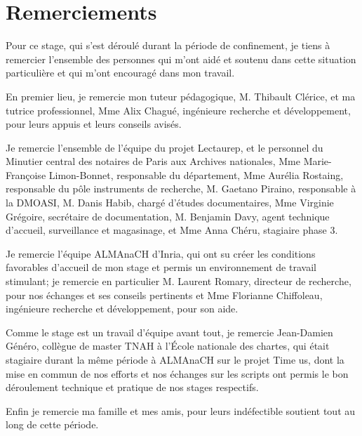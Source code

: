 \chapter*{Remerciements}

Pour ce stage, qui s'est déroulé durant la période de confinement, je tiens à remercier l'ensemble des personnes qui m'ont aidé et soutenu dans cette situation particulière et qui m'ont encouragé dans mon travail.

En premier lieu, je remercie mon tuteur pédagogique, M. Thibault Clérice, et ma tutrice professionnel, Mme Alix Chagué, ingénieure recherche et développement, pour leurs appuis et leurs conseils avisés. 

Je remercie l'ensemble de l'équipe du projet Lectaurep, et le personnel du Minutier central des notaires de Paris aux Archives nationales, Mme Marie-Françoise Limon-Bonnet, responsable du département, Mme Aurélia Rostaing, responsable du pôle instruments de recherche, M. Gaetano Piraino, responsable à la DMOASI, M. Danis Habib, chargé d'études documentaires, Mme Virginie Grégoire, secrétaire de documentation, M. Benjamin Davy, agent technique d'accueil, surveillance et magasinage, et Mme Anna Chéru, stagiaire phase 3. 

Je remercie l'équipe ALMAnaCH d'Inria, qui ont su créer les conditions favorables d'accueil de mon stage et permis un environnement de travail stimulant; je remercie en particulier M. Laurent Romary, directeur de recherche, pour nos échanges et ses conseils pertinents et Mme Florianne Chiffoleau, ingénieure recherche et développement, pour son aide.

Comme le stage est un travail d'équipe avant tout, je remercie Jean-Damien Généro, collègue de master TNAH à l'École nationale des chartes, qui était stagiaire durant la même période à ALMAnaCH sur le projet Time us, dont la mise en commun de nos efforts et nos échanges sur les scripts ont permis le bon déroulement technique et pratique de nos stages respectifs.

Enfin je remercie ma famille et mes amis, pour leurs indéfectible soutient tout au long de cette période. 